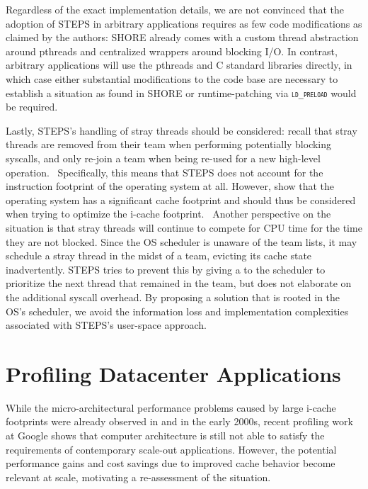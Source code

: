 \documentclass[12pt,a4paper]{book}
\begin{document}
Regardless of the exact implementation details, we are not convinced that the adoption of STEPS in arbitrary applications requires as few code modifications as claimed by the authors:
SHORE already comes with a custom thread abstraction around pthreads and centralized wrappers around blocking I/O.
In contrast, arbitrary applications will use the pthreads and C standard libraries directly, in which case
either substantial modifications to the code base are necessary to establish a situation as found in SHORE
or runtime-patching via \textsc{\texttt{ld\_preload}} would be required.

Lastly, STEPS's handling of stray threads should be considered: recall that stray threads are removed from their team when performing potentially blocking syscalls, and only re-join a team when being re-used for a new high-level operation.~\cite{steps}
Specifically, this means that STEPS does not account for the instruction footprint of the operating system at all.
However, \citeauthor*{osCacheFootprint} show that the operating system has a significant cache footprint and should thus be considered when trying to optimize the i-cache footprint.~\cite{osCacheFootprint,compspr} %
Another perspective on the situation is that stray threads will continue to compete for CPU time for the time they are not blocked.
Since the OS scheduler is unaware of the team lists, it may schedule a stray thread in the midst of a team, evicting its cache state inadvertently.
STEPS tries to prevent this by giving a  to the scheduler to prioritize the next thread that remained in the team, but does not elaborate on the additional syscall overhead.
By proposing a solution that is rooted in the OS's scheduler, we avoid the information loss and implementation complexities associated with STEPS's user-space approach.

\section{Profiling Datacenter Applications}\label{ch:relwork:profiling}

While the micro-architectural performance problems caused by large i-cache footprints were already observed in \cite{cohort} and \cite{steps} in the early 2000s,
recent profiling work at Google shows that computer architecture is still not able to satisfy the requirements of contemporary scale-out applications.
However, the potential performance gains and cost savings due to improved cache behavior become relevant at scale, motivating a re-assessment of the situation.
\end{document}
